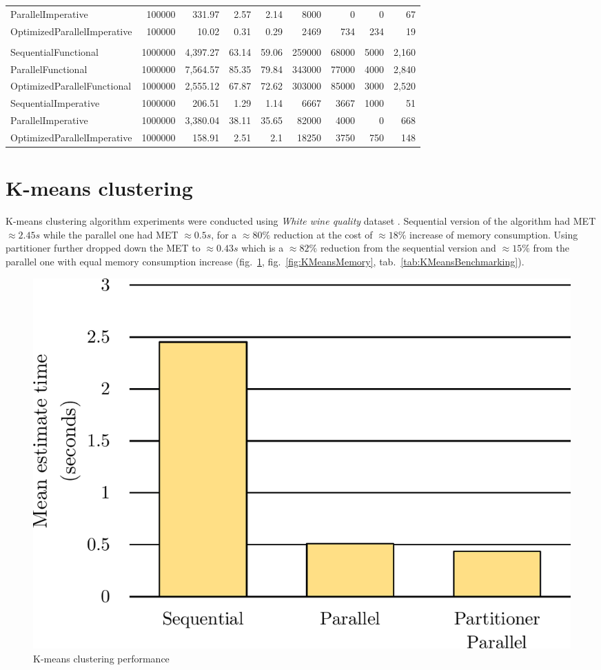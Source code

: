 \begin{table}
\begin{tabularx}{\linewidth}{Xrrrrrrrr}
ParallelImperative	&	100000	&	331.97	&	2.57	&	2.14	&	8000	&	0	&	0	&	67	\\
OptimizedParallelImperative	&	100000	&	10.02	&	0.31	&	0.29	&	2469	&	734	&	234	&	19	\\
&&&&&&&&\\
SequentialFunctional	&	1000000	&	4,397.27	&	63.14	&	59.06	&	259000	&	68000	&	5000	&	2,160	\\
ParallelFunctional	&	1000000	&	7,564.57	&	85.35	&	79.84	&	343000	&	77000	&	4000	&	2,840	\\
OptimizedParallelFunctional	&	1000000	&	2,555.12	&	67.87	&	72.62	&	303000	&	85000	&	3000	&	2,520	\\
SequentialImperative	&	1000000	&	206.51	&	1.29	&	1.14	&	6667	&	3667	&	1000	&	51	\\
ParallelImperative	&	1000000	&	3,380.04	&	38.11	&	35.65	&	82000	&	4000	&	0	&	668	\\
OptimizedParallelImperative	&	1000000	&	158.91	&	2.51	&	2.1	&	18250	&	3750	&	750	&	148	\\
			\bottomrule
    \end{tabularx}
\end{table}

\clearpage
\section{K-means clustering}
\label{sec: K-means}
K-means clustering algorithm experiments were conducted using \emph{White 
wine quality} dataset \cite{WhiteWine}. Sequential version of the algorithm 
had MET $\approx 2.45s$ while the parallel one had MET $\approx 0.5s$, for a $
\approx 80\%$ reduction at the cost of $\approx 18\%$ increase of memory 
consumption. Using partitioner further dropped down the MET to $\approx 0.43s$
 which is a $\approx 82\%$ reduction from the sequential version and $\approx 
15\%$ from the parallel one with equal memory consumption increase (fig.~\ref{fig:KMeansPerformance}, fig.~\ref{fig:KMeansMemory}, tab.~\ref{tab:KMeansBenchmarking}).

\begin{figure}[htb]
\centering
\includegraphics[width=.62\linewidth]{figures04/KMeans.pdf}
\caption{K-means clustering  performance}
\label{fig:KMeansPerformance}
\end{figure}

